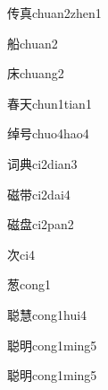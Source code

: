 \begin{verbete}[6;10]{传真}{chuan2zhen1}
\end{verbete}

\begin{verbete}[11]{船}{chuan2}
\end{verbete}

\begin{verbete}[7]{床}{chuang2}
\end{verbete}

\begin{verbete}[9;4]{春天}{chun1tian1}
\end{verbete}

\begin{verbete}[11;5]{绰号}{chuo4hao4}
\end{verbete}

\begin{verbete}[7;8]{词典}{ci2dian3}
\end{verbete}

\begin{verbete}[14;9]{磁带}{ci2dai4}
\end{verbete}

\begin{verbete}[14;11]{磁盘}{ci2pan2}
\end{verbete}

\begin{verbete}[6]{次}{ci4}
\end{verbete}

\begin{verbete}[12]{葱}{cong1}
\end{verbete}

\begin{verbete}[15;15]{聪慧}{cong1hui4}
\end{verbete}

\begin{verbete}[15;8]{聪明}{cong1ming5}
\end{verbete}

\begin{verbete}[15;8]{聪明}{cong1ming5}
\end{verbete}

